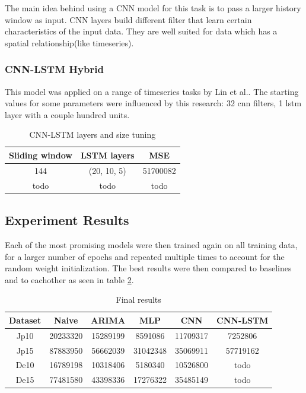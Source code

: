 \documentclass[12pt]{article}
\begin{document}
  The main idea behind using a CNN model for this task is to pass a larger history window as input. 
  CNN layers build different filter that learn certain characteristics of the input data. They are well 
  suited for data which has a spatial relationship(like timeseries)\cite{cnn}.

  \subsubsection{CNN-LSTM Hybrid}
  This model was applied on a range of timeseries tasks by Lin et al.\cite{cnn_lstm}.
  The starting values for 
  some parameters were influenced by this research: 32 cnn filters, 1 lstm layer with 
  a couple hundred units.

  \begin{table}
    \begin{center}
      \caption{CNN-LSTM layers and size tuning}
      \label{tab:layers_cnn_lstm}
      \begin{tabular}{c|c|c}
        \textbf{Sliding window} & \textbf{LSTM layers} & \textbf{MSE}\\
        \hline
        144 & (20, 10, 5) & 51700082\\
        todo & todo & todo\\
      \end{tabular}
    \end{center}
  \end{table}


  \subsection{Experiment Results}

  Each of the most promising models were then trained again on all training data,
  for a larger number of epochs and repeated multiple times to account for the 
  random weight initialization. The best results were then compared to baselines
  and to eachother as seen in table \ref{tab:final_eval}.

  \begin{table}[h]
    \begin{center}
      \caption{Final results}
      \label{tab:final_eval}
      \begin{tabular}{c|c|c|c|c|c}
        \textbf{Dataset} & \textbf{Naive} & \textbf{ARIMA} & \textbf{MLP} & \textbf{CNN} & \textbf{CNN-LSTM} \\
        \hline
        Jp10 & 20233320 & 15289199 & 8591086 & 11709317 & 7252806 \\
        Jp15 & 87883950 & 56662039 & 31042348 & 35069911 & 57719162 \\
        De10 & 16789198 & 10318406 & 5180340 & 10526800 & todo \\
        De15 & 77481580 & 43398336 & 17276322 & 35485149 & todo \\
      \end{tabular}
    \end{center}
  \end{table}
\end{document}

